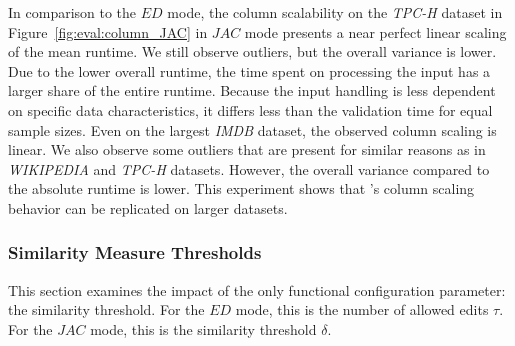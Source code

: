 In comparison to the $ED$ mode, the column scalability on the \emph{TPC-H} dataset in Figure~\ref{fig:eval:column_JAC} in $JAC$ mode presents a near perfect linear scaling of the mean runtime.
We still observe outliers, but the overall variance is lower.
Due to the lower overall runtime, the time spent on processing the input has a larger share of the entire runtime.
Because the input handling is less dependent on specific data characteristics, it differs less than the validation time for equal sample sizes.
Even on the largest \emph{IMDB} dataset, the observed column scaling is linear.
We also observe some outliers that are present for similar reasons as in \emph{WIKIPEDIA} and \emph{TPC-H} datasets.
However, the overall variance compared to the absolute runtime is lower.
This experiment shows that \sawfish's column scaling behavior can be replicated on larger datasets.

\subsubsection{Similarity Measure Thresholds}
\label{subsection:similarity_measure_scalability}
This section examines the impact of the only functional configuration parameter: the similarity threshold.
For the $ED$ mode, this is the number of allowed edits $\tau$.
For the $JAC$ mode, this is the similarity threshold $\delta$.

